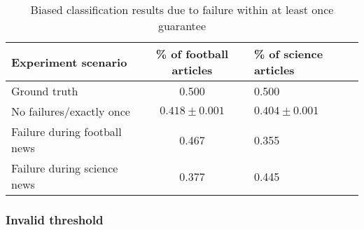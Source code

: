 \begin{table}[htbp]
\caption{Biased classification results due to failure within at least once guarantee}
\begin{threeparttable}
\begin{tabular}{lcl}
Experiment scenario    & \% of football articles & \% of science articles    \\
\hline
Ground truth   &   0.500    &   0.500    \\
No failures/exactly once   &   $0.418\pm 0.001$    &   $0.404\pm 0.001$    \\
Failure during football news   &   0.467    &   0.355    \\
Failure during science news   &   0.377    &   0.445    \\
\end{tabular}
\end{threeparttable}
\label{biased_results}
\end{table}

\subsubsection{Invalid threshold}





